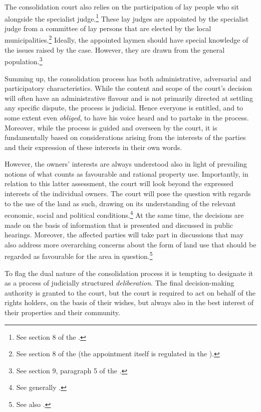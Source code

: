 The consolidation court also relies on the participation of lay people who sit alongside the specialist judge.\footnote{See section 8 of the \cite{lca79}.} These lay judges are appointed by the specialist judge from a committee of lay persons that are elected by the local municipalities.\footnote{See section 8 of the \cite{lca79} (the appointment itself is regulated in the \cite[64]{ca15}).} Ideally, the appointed laymen should have special knowledge of the issues raised by the case. However, they are drawn from the general population.\footnote{See section 9, paragraph 5 of the \cite{lca79}.}

Summing up, the consolidation process has both administrative, adversarial and participatory characteristics. While the content and scope of the court's decision will often have an administrative flavour and is not primarily directed at settling any specific dispute, the process is judicial. Hence everyone is entitled, and to some extent even \emph{obliged}, to have his voice heard and to partake in the process. Moreover, while the process is guided and overseen by the court, it is fundamentally based on considerations arising from the interests of the parties and their  expression of these interests in their own words.

However, the owners' interests are always understood also in light of prevailing notions of what counts as favourable and rational property use. Importantly, in relation to this latter assessment, the court will look beyond the expressed interests of the individual owners. The court will pose the question with regards to the use of the land as such, drawing on its understanding of the relevant economic, social and political conditions.\footnote{See generally \cite{reiten09,sky09}.} At the same time, the decisions are made on the basis of information that is presented and discussed in public hearings. Moreover, the affected parties will take part in discussions that may also address more overarching concerns about the form of land use that should be regarded as favourable for the area in question.\footnote{See also \cite{rognes07}.}

To flag the dual nature of the consolidation process it is tempting to designate it as a process of judicially structured \emph{deliberation}. The final decision-making authority is granted to the court, but the court is required to act on behalf of the rights holders, on the basis of their wishes, but always also in the best interest of their properties and their community. 

